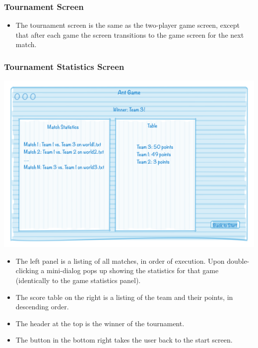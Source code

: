 \documentclass[11pt]{article}
\begin{document}
\subsubsection{Tournament Screen}

\begin{itemize}
\item The tournament screen is the same as the two-player game screen, except that after each game the screen transitions to the game screen for the next match.
\end{itemize}

\subsubsection{Tournament Statistics Screen}

\begin{center}
\includegraphics[width=\textwidth]{low-level-diagrams/interface/tournament-statistics-screen}
\end{center}

\begin{itemize}
\item The left panel is a listing of all matches, in order of execution. Upon double-clicking a mini-dialog pops up showing the statistics for that game (identically to the game statistics panel).
\item The score table on the right is a listing of the team and their points, in descending order.
\item The header at the top is the winner of the tournament.
\item The button in the bottom right takes the user back to the start screen.
\end{itemize}
\end{document}
